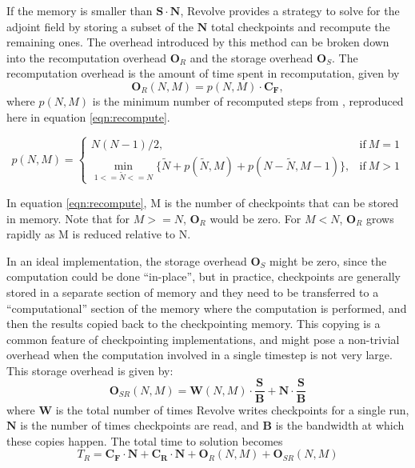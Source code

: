 If the memory is smaller than $\mathbf{S} \cdot \mathbf{N}$, Revolve provides
a strategy to solve for the adjoint field by storing a subset of the $\mathbf{N}$ total checkpoints
and recompute the remaining ones. The overhead introduced by this method can be broken down into
the recomputation overhead $\mathbf{O}_R$ and the storage overhead $\mathbf{O}_S$. The recomputation
overhead is the amount of time spent in recomputation, given by
\begin{equation}
\mathbf{O}_R(N, M) = p(N, M) \cdot \mathbf{C_F},
\end{equation}
where $p(N, M)$ is the minimum number of recomputed steps from \cite{griewank2000algorithm}, reproduced
here in equation \ref{eqn:recompute}.
\begin{figure*}
\begin{equation}
p(N, M) = \begin{cases}
      N(N-1) /2, & \text{if}\ M=1 \\
      \min\limits_{1<=\widetilde{N}<=N} \{\widetilde{N} + p(\widetilde{N}, M) + p(N-\widetilde{N}, M-1)\}, & \text{if}\ M>1
    \end{cases}
    \label{eqn:recompute}
\end{equation}
\end{figure*}
In equation \ref{eqn:recompute}, M is the number of checkpoints that can be
stored in memory. Note that for $M >=N$, $\mathbf{O}_R$ would be zero. For $M <
N$, $\mathbf{O}_R$ grows rapidly as M is reduced relative to N. 

In an ideal implementation, the storage overhead $\mathbf{O}_S$ might be zero, since the computation could
be done ``in-place'', but in practice, checkpoints are generally stored in a separate section of memory and they
need to be transferred to a ``computational'' section of the memory where the computation is performed, and then
the results copied back to the checkpointing memory. This copying is a common feature of checkpointing
implementations, and might pose a non-trivial overhead when the
computation involved in a single timestep is not very large. 
This storage overhead is given by:
\begin{equation}
\mathbf{O}_{SR}(N, M) = \mathbf{W}(N, M) \cdot \frac{\mathbf{S}}{\mathbf{B}} +
\mathbf{N} \cdot \frac{\mathbf{S}}{\mathbf{B}}
\label{eqn:storage}
\end{equation}
where $\mathbf{W}$ is the total number of times Revolve writes
checkpoints for a single run, $ \mathbf{N}$ is the number of times
checkpoints are read, and $\mathbf{B}$ is the bandwidth at which these
copies happen. The total time to solution becomes
\begin{equation}
T_R = \mathbf{C_F} \cdot \mathbf{N} + \mathbf{C_R} \cdot \mathbf{N} + \mathbf{O}_R(N, M) +
\mathbf{O}_{SR}(N, M)
\end{equation} 